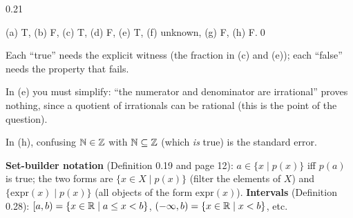 \begin{bookex}[essential]{0.21}
\begin{steps}
\end{steps}
\conclusion (a) T, (b) F, (c) T, (d) F, (e) T, (f) unknown, (g) F, (h) F.\qed
\begin{compare}
\item Each ``true'' needs the explicit witness (the fraction in (c) and (e)); each ``false'' needs the property that fails.
\item In (e) you must simplify: ``the numerator and denominator are irrational'' proves nothing, since a quotient of irrationals can be rational (this is the point of the question).
\item In (h), confusing $\mathbb{N}\in\mathbb{Z}$ with $\mathbb{N}\subseteq\mathbb{Z}$ (which \emph{is} true) is the standard error.
\end{compare}
\end{bookex}


\begin{key}
\textbf{Set-builder notation} (Definition 0.19 and page 12): $a\in\{x\mid p(x)\}$ iff $p(a)$ is true; the two forms are $\{x\in X\mid p(x)\}$ (filter the elements of $X$) and $\{\mathrm{expr}(x)\mid p(x)\}$ (all objects of the form $\mathrm{expr}(x)$). \textbf{Intervals} (Definition 0.28): $[a,b)=\{x\in\mathbb{R}\mid a\le x<b\}$, $(-\infty,b)=\{x\in\mathbb{R}\mid x<b\}$, etc.
\end{key}

